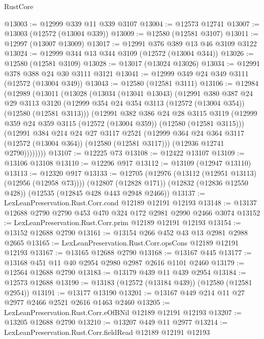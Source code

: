 \begin{lexlean}{RustCore}
\begin{coremodule}
@13003 := @12999 @339 @11 @339 @3107
@13004 := @12573 @12741
@13007 := @13003 (@12572 (@13004 @339))
@13009 := @12580 (@12581 @3107)
@13011 := @12997 (@13007 @13009)
@13017 := @12991 @376 @389 @13 @46 @3109 @3122
@13024 := @12999 @344 @13 @344 @3109 (@12572 (@13004 @344))
@13026 := @12580 (@12581 @3109)
@13028 := @13017 (@13024 @13026)
@13034 := @12991 @378 @388 @24 @30 @3111 @3121
@13041 := @12999 @349 @24 @349 @3111 (@12572 (@13004 @349))
@13043 := @12580 (@12581 @3111)
@13106 := @12984
    (@12989
      (@13011
        (@13028
          (@13034
            (@13041 @13043)
            (@12991
              @380
              @387
              @24
              @29
              @3113
              @3120
              (@12999 @354 @24 @354 @3113 (@12572 (@13004 @354)) (@12580 (@12581 @3113)))
              (@12991
                @382
                @386
                @24
                @28
                @3115
                @3119
                (@12999 @359 @24 @359 @3115 (@12572 (@13004 @359)) (@12580 (@12581 @3115)))
                (@12991
                  @384
                  @214
                  @24
                  @27
                  @3117
                  @2521
                  (@12999 @364 @24 @364 @3117 (@12572 (@13004 @364)) (@12580 (@12581 @3117)))
                  (@12936 @12741 @2790))))))))
@13107 := @12225 @73
@13108 := @12422 @13107
@13109 := @13106 @13108
@13110 := @12296 @917
@13112 := @13109 (@12947 @13110)
@13113 := @12320 @917
@13133 := @12705
    (@12976 (@13112 (@12951 @13113) (@12956 (@12958 @73))))
    (@12807 (@12828 @171))
    (@12832 (@12836 @12550 @428))
    (@12535 (@12845 @428 @443 @2948 @2466))
@13137 := LexLeanPreservation.Rust.Corr.cond @12189 @12191 @12193
@13148 := @13137 @12688 @2790 @2790 @453 @470 @324 @172 @2981 @2990 @2466 @3074
@13152 := LexLeanPreservation.Rust.Corr.prim @12189 @12191 @12193
@13154 := @13152 @12688 @2790
@13161 := @13154 @266 @452 @43 @13 @2981 @2988 @2665
@13165 := LexLeanPreservation.Rust.Corr.opsCons @12189 @12191 @12193
@13167 := @13165 @12688 @2790
@13168 := @13167 @445
@13177 := @13168 @451 @11 @40 @2954 @2980 @2987 @2616 @1101 @2460
@13179 := @12564 @12688 @2790
@13183 := @13179 @439 @11 @439 @2954
@13184 := @12573 @12688
@13190 := @13183 (@12572 (@13184 @439)) (@12580 (@12581 @2954))
@13191 := @13177 @13190
@13201 := @13167 @449 @214 @11 @27 @2977 @2466 @2521 @2616 @1463 @2460
@13205 := LexLeanPreservation.Rust.Corr.eOfBNil @12189 @12191 @12193
@13207 := @13205 @12688 @2790
@13210 := @13207 @449 @11 @2977
@13214 := LexLeanPreservation.Rust.Corr.fieldRead @12189 @12191 @12193

\end{coremodule}
\end{lexlean}
